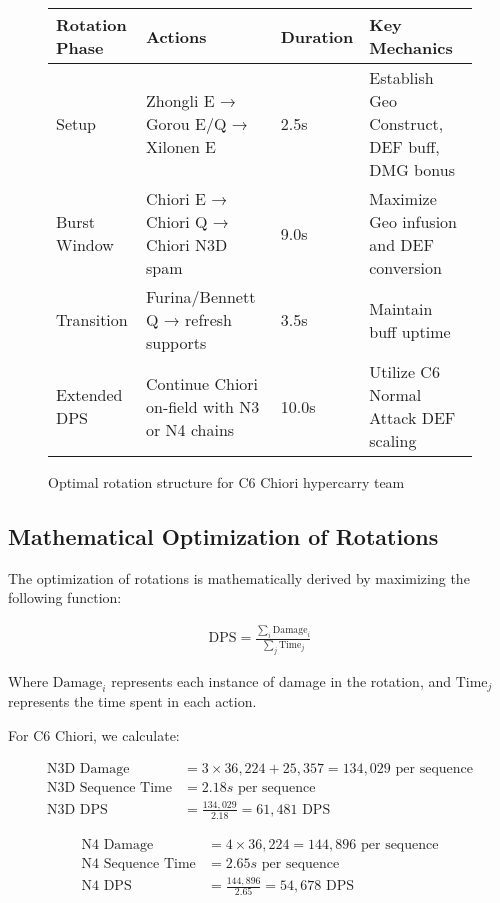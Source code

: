 \documentclass[12pt,a4paper]{article}
\begin{document}
\begin{figure}[H]
\centering
\begin{tabularx}{\textwidth}{|X|X|X|X|}
\hline
\textbf{Rotation Phase} & \textbf{Actions} & \textbf{Duration} & \textbf{Key Mechanics} \\
\hline
Setup & Zhongli E → Gorou E/Q → Xilonen E & 2.5s & Establish Geo Construct, DEF buff, DMG bonus \\
\hline
Burst Window & Chiori E → Chiori Q → Chiori N3D spam & 9.0s & Maximize Geo infusion and DEF conversion \\
\hline
Transition & Furina/Bennett Q → refresh supports & 3.5s & Maintain buff uptime \\
\hline
Extended DPS & Continue Chiori on-field with N3 or N4 chains & 10.0s & Utilize C6 Normal Attack DEF scaling \\
\hline
\end{tabularx}
\caption{Optimal rotation structure for C6 Chiori hypercarry team}
\label{tab:rotation}
\end{figure}

\subsection{Mathematical Optimization of Rotations}

The optimization of rotations is mathematically derived by maximizing the following function:

\begin{align}
\text{DPS} = \frac{\sum_{i} \text{Damage}_i}{\sum_{j} \text{Time}_j}
\end{align}

Where $\text{Damage}_i$ represents each instance of damage in the rotation, and $\text{Time}_j$ represents the time spent in each action.

For C6 Chiori, we calculate:

\begin{align}
\text{N3D Damage} &= 3 \times 36,224 + 25,357 = 134,029 \text{ per sequence} \\
\text{N3D Sequence Time} &= 2.18s \text{ per sequence} \\
\text{N3D DPS} &= \frac{134,029}{2.18} = 61,481 \text{ DPS}
\end{align}

\begin{align}
\text{N4 Damage} &= 4 \times 36,224 = 144,896 \text{ per sequence} \\
\text{N4 Sequence Time} &= 2.65s \text{ per sequence} \\
\text{N4 DPS} &= \frac{144,896}{2.65} = 54,678 \text{ DPS}
\end{align}
\end{document}
